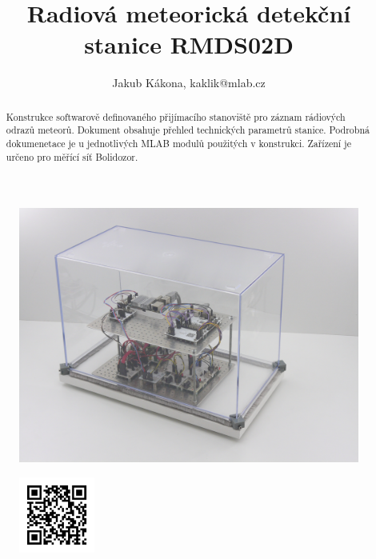 \documentclass[12pt,a4paper,oneside]{article}
\begin{document}
\title{Radiová meteorická detekční stanice RMDS02D}
\author{Jakub Kákona, kaklik@mlab.cz }
\maketitle

\begin{abstract}
Konstrukce softwarově definovaného přijímacího stanoviště pro záznam rádiových odrazů meteorů. Dokument obsahuje přehled technických parametrů stanice. Podrobná dokumenetace je u jednotlivých MLAB modulů použitých v konstrukci. Zařízení je určeno pro měřící síť Bolidozor. 
\end{abstract}

\begin{figure} [htbp]
\begin{center}
\includegraphics [width=120mm] {./img/RMDS02D_showcase1.JPG} 
\end{center}
\end{figure}

\begin{figure} [b]
\includegraphics [width=25mm] {./img/RMDS02C-QRcode.png} 
\end{figure}

\newpage
\tableofcontents
\end{document}
